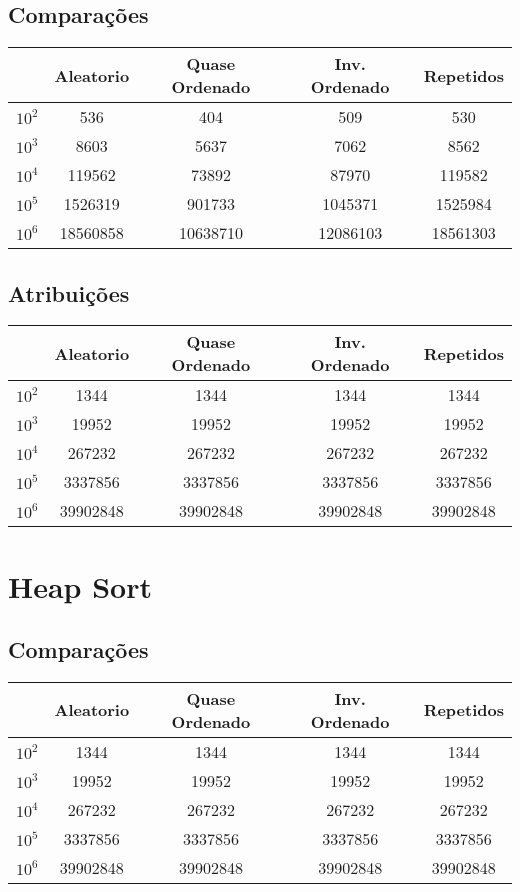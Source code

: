 \subsection{Comparações}
\begin{tabular}{|c|c|c|c|c|}
\hline
  & Aleatorio & Quase Ordenado & Inv. Ordenado & Repetidos \\
  \hline
$10^2$ & 536       & 404            & 509           & 530       \\
\hline
$10^3$ & 8603      & 5637           & 7062          & 8562      \\
\hline
$10^4$ & 119562    & 73892          & 87970         & 119582    \\
\hline
$10^5$ & 1526319   & 901733         & 1045371       & 1525984   \\
\hline
$10^6$ & 18560858  & 10638710       & 12086103      & 18561303 \\
\hline
\end{tabular}
\subsection{Atribuições}
\begin{tabular}{|c|c|c|c|c|}
\hline
  & Aleatorio & Quase Ordenado & Inv. Ordenado & Repetidos \\
  \hline
$10^2$ & 1344      & 1344           & 1344          & 1344      \\
\hline
$10^3$ & 19952     & 19952          & 19952         & 19952     \\
\hline
$10^4$ & 267232    & 267232         & 267232        & 267232    \\
\hline
$10^5$ & 3337856   & 3337856        & 3337856       & 3337856   \\
\hline
$10^6$ & 39902848  & 39902848       & 39902848      & 39902848 \\
\hline
\end{tabular}

\section{Heap Sort}
\label{sec:heap_sort}
\subsection{Comparações}
\begin{tabular}{|c|c|c|c|c|}
\hline
  & Aleatorio & Quase Ordenado & Inv. Ordenado & Repetidos \\
  \hline
$10^2$ & 1344      & 1344           & 1344          & 1344      \\
\hline
$10^3$ & 19952     & 19952          & 19952         & 19952     \\
\hline
$10^4$ & 267232    & 267232         & 267232        & 267232    \\
\hline
$10^5$ & 3337856   & 3337856        & 3337856       & 3337856   \\
\hline
$10^6$ & 39902848  & 39902848       & 39902848      & 39902848 \\
\hline
\end{tabular}
